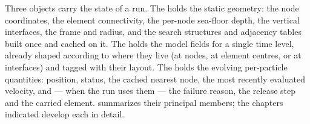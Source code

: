 Three objects carry the state of a run. The  holds the static geometry:
the node coordinates, the element connectivity, the per-node sea-floor depth, the
vertical interfaces, the frame and radius, and the search structures and adjacency tables built once and
cached on it. The  holds the model fields for a single
time level, already shaped according to where they live (at nodes, at element
centres, or at interfaces) and tagged with their layout. The 
holds the evolving per-particle quantities: position, status, the cached nearest
node, the most recently evaluated velocity, and --- when the run uses them --- the failure reason, the
release step and the carried element. 
summarizes their principal members; the chapters indicated develop each in detail.

